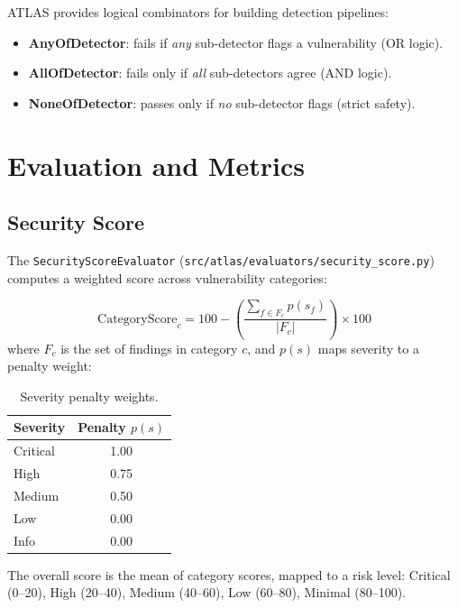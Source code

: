 \documentclass[12pt,a4paper]{report}
\begin{document}
ATLAS provides logical combinators for building detection pipelines:
\begin{itemize}
    \item \textbf{AnyOfDetector}: fails if \textit{any} sub-detector flags a vulnerability (OR logic).
    \item \textbf{AllOfDetector}: fails only if \textit{all} sub-detectors agree (AND logic).
    \item \textbf{NoneOfDetector}: passes only if \textit{no} sub-detector flags (strict safety).
\end{itemize}

\section{Evaluation and Metrics}
\label{sec:evaluation}

\subsection{Security Score}

The \texttt{SecurityScoreEvaluator} (\texttt{src/atlas/evaluators/security\_score.py}) computes a weighted score across vulnerability categories:

\begin{equation}
\text{CategoryScore}_c = 100 - \left(\frac{\sum_{f \in F_c} p(s_f)}{|F_c|}\right) \times 100
\end{equation}
where $F_c$ is the set of findings in category $c$, and $p(s)$ maps severity to a penalty weight:

\begin{table}[htbp]
\centering
\caption{Severity penalty weights.}
\begin{tabular}{@{}lc@{}}
\toprule
\textbf{Severity} & \textbf{Penalty} $p(s)$ \\
\midrule
Critical & 1.00 \\
High & 0.75 \\
Medium & 0.50 \\
Low & 0.00 \\
Info & 0.00 \\
\bottomrule
\end{tabular}
\end{table}

The overall score is the mean of category scores, mapped to a risk level: Critical (0--20), High (20--40), Medium (40--60), Low (60--80), Minimal (80--100).
\end{document}
